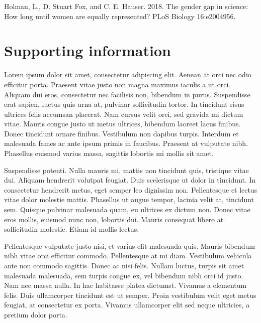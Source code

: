 \documentclass[12pt,]{article}
\begin{document}
\hypertarget{refs}{}
\leavevmode\hypertarget{ref-Holman_2018}{}%
Holman, L., D. Stuart Fox, and C. E. Hauser. 2018. The gender gap in
science: How long until women are equally represented? PLoS Biology
16:e2004956.

\newpage

\hypertarget{supporting-information}{%
\section{Supporting information}\label{supporting-information}}

Lorem ipsum dolor sit amet, consectetur adipiscing elit. Aenean at orci
nec odio efficitur porta. Praesent vitae justo non magna maximus iaculis
a ut orci. Aliquam dui eros, consectetur nec facilisis non, bibendum in
purus. Suspendisse erat sapien, luctus quis urna at, pulvinar
sollicitudin tortor. In tincidunt risus ultrices felis accumsan
placerat. Nam cursus velit orci, sed gravida mi dictum vitae. Mauris
congue justo ut metus ultrices, bibendum laoreet lacus finibus. Donec
tincidunt ornare finibus. Vestibulum non dapibus turpis. Interdum et
malesuada fames ac ante ipsum primis in faucibus. Praesent at vulputate
nibh. Phasellus euismod varius massa, sagittis lobortis mi mollis sit
amet.

Suspendisse potenti. Nulla mauris mi, mattis non tincidunt quis,
tristique vitae dui. Aliquam hendrerit volutpat feugiat. Duis
scelerisque ut dolor in tincidunt. In consectetur hendrerit metus, eget
semper leo dignissim non. Pellentesque et lectus vitae dolor molestie
mattis. Phasellus ut augue tempor, lacinia velit at, tincidunt sem.
Quisque pulvinar malesuada quam, eu ultrices ex dictum non. Donec vitae
eros mollis, euismod nunc non, lobortis dui. Mauris consequat libero at
sollicitudin molestie. Etiam id mollis lectus.

Pellentesque vulputate justo nisi, et varius elit malesuada quis. Mauris
bibendum nibh vitae orci efficitur commodo. Pellentesque at mi diam.
Vestibulum vehicula ante non commodo sagittis. Donec ac nisi felis.
Nullam luctus, turpis sit amet malesuada malesuada, sem turpis congue
ex, vel bibendum nibh orci id justo. Nam nec massa nulla. In hac
habitasse platea dictumst. Vivamus a elementum felis. Duis ullamcorper
tincidunt est ut semper. Proin vestibulum velit eget metus feugiat, at
consectetur ex porta. Vivamus ullamcorper elit sed neque ultricies, a
pretium dolor porta.
\end{document}
